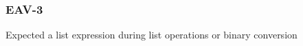 \subsubsection{EAV-3}\label{sec:error_code_eav_3}

Expected a list expression during list operations or binary conversion

